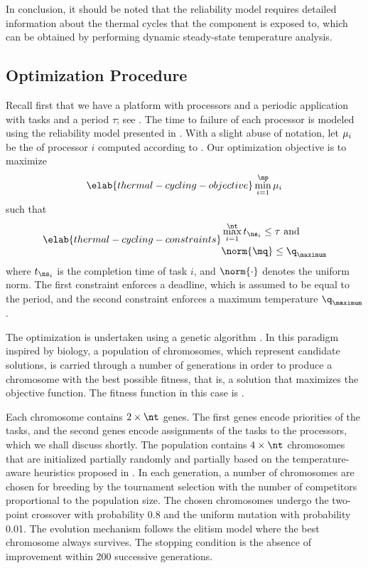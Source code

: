 In conclusion, it should be noted that the reliability model requires detailed
information about the thermal cycles that the component is exposed to, which can
be obtained by performing dynamic steady-state temperature analysis.

\subsection{Optimization Procedure}

Recall first that we have a platform with \np processors and a periodic
application with \nt tasks and a period $\tau$; see . The
time to failure of each processor is modeled using the reliability model
presented in . With a slight abuse of notation, let
$\mu_i$ be the  of processor $i$ computed according to
. Our optimization objective is to maximize
\begin{equation} \elab{thermal-cycling-objective}
  \min_{i = 1}^\np \mean_i
\end{equation}
such that
\begin{align} \elab{thermal-cycling-constraints}
  \begin{split}
    & \max_{i = 1}^\nt t_{\ns_i} \leq \tau \text{ and} \\
    & \norm{\mq} \leq \q_\maximum
  \end{split}
\end{align}
where $t_{\ns_i}$ is the completion time of task $i$, and $\norm{\cdot}$ denotes
the uniform norm. The first constraint enforces a deadline, which is assumed to
be equal to the period, and the second constraint enforces a maximum
temperature $\q_\maximum$.

The optimization is undertaken using a genetic algorithm \cite{schmitz2004}. In
this paradigm inspired by biology, a population of chromosomes, which represent
candidate solutions, is carried through a number of generations in order to
produce a chromosome with the best possible fitness, that is, a solution that
maximizes the objective function. The fitness function in this case is
.

Each chromosome contains $2 \times \nt$ genes. The first \nt genes encode
priorities of the tasks, and the second \nt genes encode assignments of the
tasks to the processors, which we shall discuss shortly. The population contains
$4 \times \nt$ chromosomes that are initialized partially randomly and partially
based on the temperature-aware heuristics proposed in \cite{xie2006}. In each
generation, a number of chromosomes are chosen for breeding by the tournament
selection with the number of competitors proportional to the population size.
The chosen chromosomes undergo the two-point crossover with probability 0.8 and
the uniform mutation with probability 0.01. The evolution mechanism follows the
elitism model where the best chromosome always survives. The stopping condition
is the absence of improvement within 200 successive generations.

